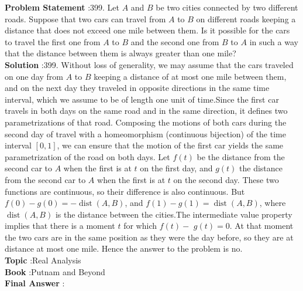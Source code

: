 \documentclass[10pt]{article}
\begin{document}
\textbf{Problem Statement} :399. Let $A$ and $B$ be two cities connected by two different roads. Suppose that two cars can travel from $A$ to $B$ on different roads keeping a distance that does not exceed one mile between them. Is it possible for the cars to travel the first one from $A$ to $B$ and the second one from $B$ to $A$ in such a way that the distance between them is always greater than one mile?\\
\textbf{Solution} :399. Without loss of generality, we may assume that the cars traveled on one day from $A$ to $B$ keeping a distance of at most one mile between them, and on the next day they traveled in opposite directions in the same time interval, which we assume to be of length one unit of time.Since the first car travels in both days on the same road and in the same direction, it defines two parametrizations of that road. Composing the motions of both cars during the second day of travel with a homeomorphism (continuous bijection) of the time interval $[0,1]$, we can ensure that the motion of the first car yields the same parametrization of the road on both days. Let $f(t)$ be the distance from the second car to $A$ when the first is at $t$ on the first day, and $g(t)$ the distance from the second car to $A$ when the first is at $t$ on the second day. These two functions are continuous, so their difference is also continuous. But $f(0)-g(0)=-\operatorname{dist}(A, B)$, and $f(1)-g(1)=\operatorname{dist}(A, B)$, where $\operatorname{dist}(A, B)$ is the distance between the cities.The intermediate value property implies that there is a moment $t$ for which $f(t)-$ $g(t)=0$. At that moment the two cars are in the same position as they were the day before, so they are at distance at most one mile. Hence the answer to the problem is no. \\
\textbf{Topic} :Real Analysis\\
\textbf{Book} :Putnam and Beyond\\
\textbf{Final Answer} :\\
\end{document}
